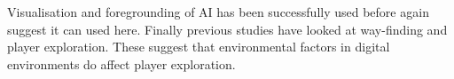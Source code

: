 \documentclass[journal]{IEEEtran}
\begin{document}
Visualisation and foregrounding of AI has been successfully used before again suggest it can used here. Finally previous studies have looked at way-finding and player exploration. These suggest that environmental factors in digital environments do affect player exploration.






\end{document}
